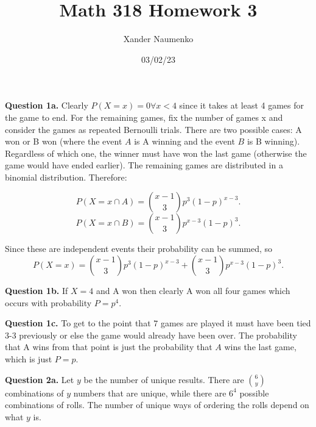 \documentclass[letterpaper, reqno,11pt]{article}
\begin{document}
\title{Math 318 Homework 3}
\date{03/02/23}
\author{Xander Naumenko}
\maketitle

{\medskip\noindent\bf Question 1a.} Clearly $P(X=x)=0\forall x<4$ since it takes at least 4 games for the game to end. For the remaining games, fix the number of games x and consider the games as repeated Bernoulli trials. There are two possible cases: A won or B won (where the event $A$ is A winning and the event $B$ is B winning). Regardless of which one, the winner must have won the last game (otherwise the game would have ended earlier). The remaining games are distributed in a binomial distribution. Therefore:

\[
    P(X=x\cap A)={x-1\choose 3}p^{3}(1-p)^{x-3}
.\]
\[
    P(X=x\cap B)={x-1\choose 3}p^{x-3}(1-p)^{3}
.\]

Since these are independent events their probability can be summed, so
\[
P(X=x)={x-1\choose 3}p^{3}(1-p)^{x-3}+{x-1\choose 3}p^{x-3}(1-p)^{3}
.\]

{\medskip\noindent\bf Question 1b.} If $X=4$ and A won then clearly A won all four games which occurs with probability $P=p^{4}$. 


{\medskip\noindent\bf Question 1c.} To get to the point that $7$ games are played it must have been tied 3-3 previously or else the game would already have been over. The probability that A wins from that point is just the probability that $A$ wins the last game, which is just $P=p$. 


{\medskip\noindent\bf Question 2a.} Let $y$ be the number of unique results. There are ${6\choose y}$ combinations of $y$ numbers that are unique, while there are $6^{4}$ possible combinations of rolls. The number of unique ways of ordering the rolls depend on what $y$ is. 
\end{document}
